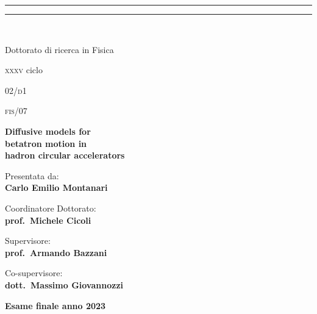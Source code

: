 \begin{titlepage}
\begin{center}
{
{{\Large{\textsc{}}}}} 
{\rule[0.1cm]{\textwidth}{0.1mm}}
{\rule[0.5cm]{\textwidth}{0.6mm}}
\\

\vspace{2em}

\Large{Dottorato di ricerca in Fisica}

\vspace{1ex}

\large{\textsc{xxxv} ciclo}
\end{center}

\vspace{3em}

 02/\textsc{d}1

\vspace{1ex}

 \textsc{fis}/07

\vfill

\begin{center}{
{\LARGE{\bf Diffusive models for\\ betatron motion in \\ hadron circular accelerators}}\\
}\end{center}

\vfill %

\noindent
\begin{minipage}{.45\textwidth}
\begin{flushleft}
{\color{unibo}Presentata da:}\\
\textbf{Carlo Emilio Montanari}
\end{flushleft}
\end{minipage}

\vfill

\noindent
\begin{minipage}[t]{.45\textwidth}
{\color{unibo}Coordinatore Dottorato:}\\
\textbf{prof.\ Michele Cicoli}
\end{minipage}
\hfill
\begin{minipage}[t]{.45\textwidth}
\begin{flushright}
{\color{unibo}Supervisore:}\\
\textbf{prof.\ Armando Bazzani}\\

\vspace{1em}

{\color{unibo}Co-supervisore:}\\
\textbf{dott.\ Massimo Giovannozzi}
\end{flushright}
\end{minipage}

\vfill

\begin{center}
\textbf{Esame finale anno 2023}
\end{center}
\end{titlepage}
